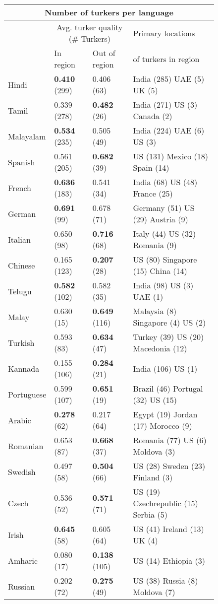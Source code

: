 \begin{figure}[h]
\footnotesize
\begin{tabular}{llll}
\multicolumn{4}{c}{Number of turkers per language}\\
\hline\hline
&\multicolumn{2}{c}{Avg. turker quality (\# Turkers)}&Primary locations\\
&In region&Out of region&of turkers in region\\
\hline\hline
Hindi&\textbf{0.410} (299)&0.406 (63)&India (285) UAE (5) UK (5) \\
Tamil&0.339 (278) &\textbf{0.482} (26)&India (271) US (3) Canada (2) \\
Malayalam&\textbf{0.534} (235)&0.505 (49)&India (224) UAE (6) US (3) \\
Spanish&0.561 (205) &\textbf{0.682} (39)&US (131) Mexico (18) Spain (14) \\
French&\textbf{0.636} (183)&0.541 (34)&India (68) US (48) France (25) \\
German&\textbf{0.691} (99)&0.678 (71)&Germany (51) US (29) Austria (9) \\
Italian&0.650 (98) &\textbf{0.716} (68)&Italy (44) US (32) Romania (9) \\
Chinese&0.165 (123) &\textbf{0.207} (28)&US (80) Singapore (15) China (14) \\
Telugu&\textbf{0.582} (102)&0.582 (35)&India (98) US (3) UAE (1) \\
Malay&0.630 (15) &\textbf{0.649} (116)&Malaysia (8) Singapore (4) US (2) \\
Turkish&0.593 (83) &\textbf{0.634} (47)&Turkey (39) US (20) Macedonia (12) \\
Kannada&0.155 (106) &\textbf{0.284} (21)&India (106) US (1) \\
Portuguese&0.599 (107) &\textbf{0.651} (19)&Brazil (46) Portugal (32) US (15) \\
Arabic&\textbf{0.278} (62)&0.217 (64)&Egypt (19) Jordan (17) Morocco (9) \\
Romanian&0.653 (87) &\textbf{0.668} (37)&Romania (77) US (6) Moldova (3) \\
Swedish&0.497 (58) &\textbf{0.504} (66)&US (28) Sweden (23) Finland (3) \\
Czech&0.536 (52) &\textbf{0.571} (71)&US (19) Czechrepublic (15) Serbia (5) \\
Irish&\textbf{0.645} (58)&0.605 (64)&US (41) Ireland (13) UK (4) \\
Amharic&0.080 (17) &\textbf{0.138} (105)&US (14) Ethiopia (3) \\
Russian&0.202 (72) &\textbf{0.275} (49)&US (38) Russia (8) Moldova (7) \\
\hline\hline
\end{tabular}
\end{figure}
